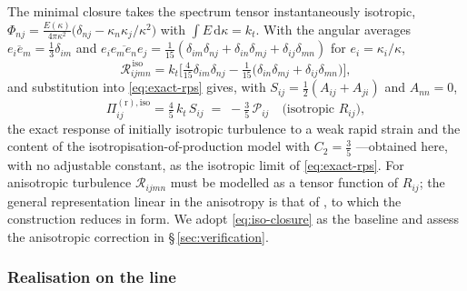 \documentclass[lineno]{JFM-FLM_Au}
\begin{document}
The minimal closure takes the spectrum tensor instantaneously isotropic,
$\Phi_{nj}=\frac{E(\kappa)}{4\pi\kappa^2}
\big(\delta_{nj}-\kappa_n\kappa_j/\kappa^2\big)$ with
$\int E\,\mathrm{d}\kappa=k_t$. With the angular averages
$\overline{e_ie_m}=\tfrac13\delta_{im}$ and
$\overline{e_ie_me_ne_j}=\tfrac1{15}(\delta_{im}\delta_{nj}
+\delta_{in}\delta_{mj}+\delta_{ij}\delta_{mn})$ for
$e_i=\kappa_i/\kappa$,
\begin{equation}
  \mathcal{R}_{ijmn}^{\,\mathrm{iso}}
  = k_t\Big[\tfrac{4}{15}\delta_{im}\delta_{nj}
    -\tfrac1{15}\big(\delta_{in}\delta_{mj}
    +\delta_{ij}\delta_{mn}\big)\Big],
  \label{eq:iso-closure}
\end{equation}
and substitution into \eqref{eq:exact-rps} gives, with
$S_{ij}=\tfrac12(A_{ij}+A_{ji})$ and $A_{nn}=0$,
\begin{equation}
  \Pi^{(\mathrm r),\mathrm{iso}}_{ij}
  = \tfrac{4}{5}\,k_t\,S_{ij}
  \;=\; -\tfrac{3}{5}\,\mathcal{P}_{ij}
  \quad\text{(isotropic $R_{ij}$)},
  \label{eq:crow}
\end{equation}
the exact response of initially isotropic turbulence to a weak rapid
strain \citep{Crow1968} and the content of the
isotropisation-of-production model with $C_2=\tfrac35$
\citep{Pope2000}---obtained here, with no adjustable constant, as the
isotropic limit of \eqref{eq:exact-rps}. For anisotropic turbulence
$\mathcal{R}_{ijmn}$ must be modelled as a tensor function of $R_{ij}$;
the general representation linear in the anisotropy is that of
\citet{LaunderReeceRodi1975}, to which the construction reduces in form.
We adopt \eqref{eq:iso-closure} as the baseline and assess the
anisotropic correction in \S\,\ref{sec:verification}.

\subsubsection{Realisation on the line}\label{sec:line-realisation}
\end{document}
